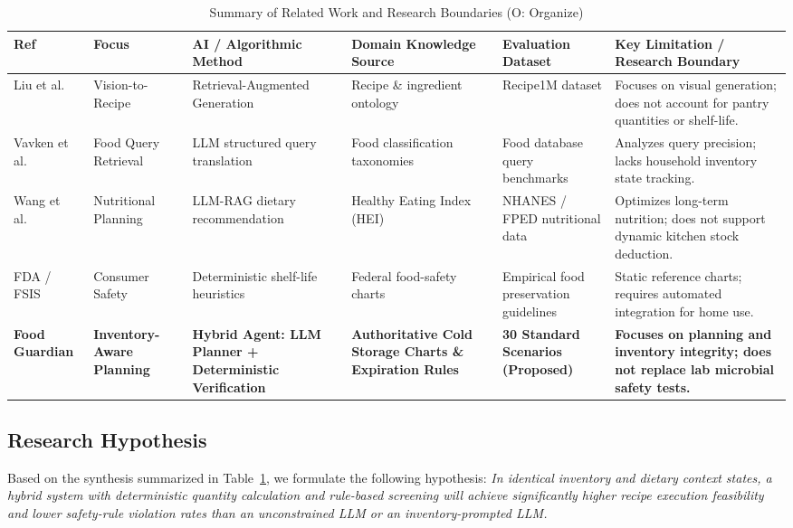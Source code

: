 \begin{table}[t]
\caption{Summary of Related Work and Research Boundaries (O: Organize)}
\label{tab:related_work}
\centering
\begin{tabular}{lp{1.8cm}p{3.2cm}p{3.2cm}p{2.5cm}p{3.5cm}}
\toprule
\textbf{Ref} & \textbf{Focus} & \textbf{AI / Algorithmic Method} & \textbf{Domain Knowledge Source} & \textbf{Evaluation Dataset} & \textbf{Key Limitation / Research Boundary} \\
\midrule
Liu et al.~\cite{R4_Liu2025_WACV} & Vision-to-Recipe & Retrieval-Augmented Generation & Recipe \& ingredient ontology & Recipe1M dataset & Focuses on visual generation; does not account for pantry quantities or shelf-life. \\
Vavken et al.~\cite{R5_Vavken2026} & Food Query Retrieval & LLM structured query translation & Food classification taxonomies & Food database query benchmarks & Analyzes query precision; lacks household inventory state tracking. \\
Wang et al.~\cite{R6_Wang2026} & Nutritional Planning & LLM-RAG dietary recommendation & Healthy Eating Index (HEI) & NHANES / FPED nutritional data & Optimizes long-term nutrition; does not support dynamic kitchen stock deduction. \\
FDA / FSIS~\cite{R2_FDA2026, R3_FoodSafety2023} & Consumer Safety & Deterministic shelf-life heuristics & Federal food-safety charts & Empirical food preservation guidelines & Static reference charts; requires automated integration for home use. \\
\textbf{Food Guardian} & \textbf{Inventory-Aware Planning} & \textbf{Hybrid Agent: LLM Planner + Deterministic Verification} & \textbf{Authoritative Cold Storage Charts \& Expiration Rules} & \textbf{30 Standard Scenarios (Proposed)} & \textbf{Focuses on planning and inventory integrity; does not replace lab microbial safety tests.} \\
\bottomrule
\end{tabular}
\end{table}

\subsection{Research Hypothesis}
Based on the synthesis summarized in Table~\ref{tab:related_work}, we formulate the following hypothesis: \textit{In identical inventory and dietary context states, a hybrid system with deterministic quantity calculation and rule-based screening will achieve significantly higher recipe execution feasibility and lower safety-rule violation rates than an unconstrained LLM or an inventory-prompted LLM.}
